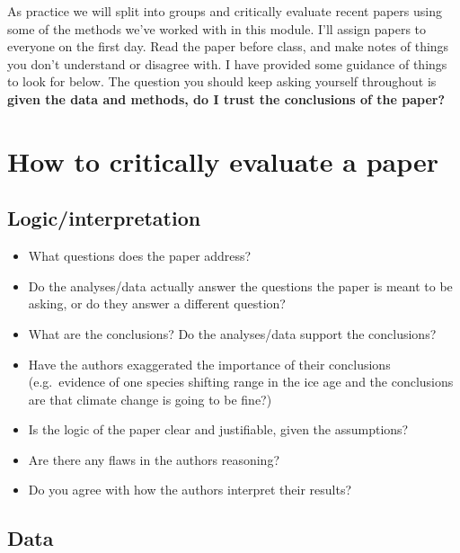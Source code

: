 \documentclass[]{book}
\begin{document}
As practice we will split into groups and critically evaluate recent
papers using some of the methods we've worked with in this module. I'll
assign papers to everyone on the first day. Read the paper before class,
and make notes of things you don't understand or disagree with. I have
provided some guidance of things to look for below. The question you
should keep asking yourself throughout is \textbf{given the data and
methods, do I trust the conclusions of the paper?}

\section{How to critically evaluate a
paper}\label{how-to-critically-evaluate-a-paper}

\subsection{Logic/interpretation}\label{logicinterpretation}

\begin{itemize}
\item
  What questions does the paper address?
\item
  Do the analyses/data actually answer the questions the paper is meant
  to be asking, or do they answer a different question?
\item
  What are the conclusions? Do the analyses/data support the
  conclusions?
\item
  Have the authors exaggerated the importance of their conclusions
  (e.g.~evidence of one species shifting range in the ice age and the
  conclusions are that climate change is going to be fine?)
\item
  Is the logic of the paper clear and justifiable, given the
  assumptions?
\item
  Are there any flaws in the authors reasoning?
\item
  Do you agree with how the authors interpret their results?
\end{itemize}

\subsection{Data}\label{data}
\end{document}
